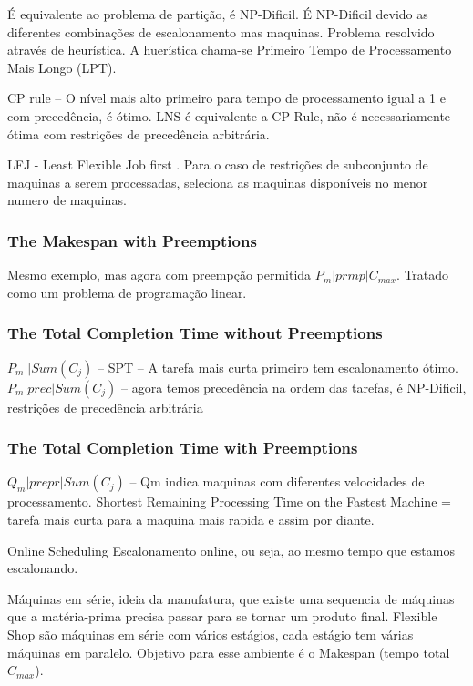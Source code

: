 	É equivalente ao problema de partição, é NP-Dificil. É  NP-Dificil devido as diferentes combinações de escalonamento mas maquinas. Problema resolvido através de heurística. A huerística chama-se Primeiro Tempo de Processamento Mais Longo (LPT).

	CP rule – O nível mais alto primeiro para tempo de processamento igual a 1 e com precedência, é ótimo. LNS é equivalente a CP Rule, não é necessariamente ótima com restrições de precedência arbitrária.

	LFJ - Least Flexible Job  first . Para o caso de restrições de subconjunto de maquinas a serem processadas, seleciona as maquinas disponíveis no menor numero de maquinas. \\
	
\subsubsection{The Makespan with Preemptions}

	Mesmo exemplo, mas agora com preempção permitida $P_m|prmp|C_{max}$. Tratado como um problema de programação linear. \\		

\subsubsection{The Total Completion Time without Preemptions}
$P_m| | Sum(C_j)$ – SPT – A tarefa mais curta primeiro tem escalonamento ótimo.
$P_m| prec | Sum(C_j)$ – agora temos precedência na ordem das tarefas, é NP-Dificil, restrições de precedência arbitrária\\

\subsubsection{The Total Completion Time with Preemptions} 
$Q_m |  prepr | Sum(C_j)$ – Qm indica maquinas com diferentes velocidades de processamento. Shortest Remaining Processing Time  on the Fastest Machine  = tarefa mais curta para a maquina mais rapida e assim por diante.

Online Scheduling Escalonamento online, ou seja, ao mesmo tempo que estamos escalonando.


Máquinas em série, ideia da manufatura, que existe uma sequencia de máquinas que a matéria-prima precisa passar para se tornar um produto final. Flexible Shop são máquinas em série com vários estágios, cada estágio tem várias máquinas em paralelo. Objetivo para esse ambiente é o Makespan (tempo total $C_{max}$). 

